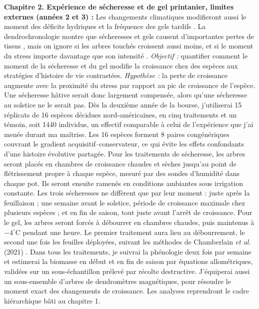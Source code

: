 \documentclass[12pt]{article}
\begin{document}
\textbf{Chapitre 2. Expérience de sécheresse et de gel printanier, limites externes (années 2 et 3) :}
Les changements climatiques modifieront aussi le moment des déficits hydriques et la fréquence des gels tardifs \cite{dox_wood_2022}. La dendrochronologie montre que sécheresses et gels causent d'importantes pertes de tissus \cite{kramer_why_2012,baumgarten_no_2023,dandrea_winters_2019}, mais on ignore si les arbres touchés croissent aussi moins, et si le moment du stress importe davantage que son intensité \cite{chamberlain_late_2021,baumgarten_no_2023,lian_summer_2020,zhang_drought_2021}. \textit{Objectif :} quantifier comment le moment de la sécheresse et du gel modifie la croissance chez des espèces aux stratégies d'histoire de vie contrastées. \textit{Hypothèse :} la perte de croissance augmente avec la proximité du stress par rapport au pic de croissance de l'espèce. Une sécheresse hâtive serait donc largement compensée, alors qu'une sécheresse au solstice ne le serait pas.
Dès la deuxième année de la bourse, j'utiliserai 15 réplicats de 16 espèces décidues nord-américaines, en cinq traitements et un témoin, soit 1440 individus, un effectif comparable à celui de l'expérience que j'ai menée durant ma maîtrise. Les 16 espèces forment 8 paires congénériques couvrant le gradient acquisitif--conservateur, ce qui évite les effets confondants d'une histoire évolutive partagée. Pour les traitements de sécheresse, les arbres seront placés en chambres de croissance chaudes et sèches jusqu'au point de flétrissement propre à chaque espèce, mesuré par des sondes d'humidité dans chaque pot. Ils seront ensuite ramenés en conditions ambiantes sous irrigation constante. Les trois sécheresses ne diffèrent que par leur moment : juste après la feuillaison ; une semaine avant le solstice, période de croissance maximale chez plusieurs espèces \cite{anderson-teixeira_carbon_2021,dorangeville_drought_2018,mcmahon_general_2015} ; et en fin de saison, tout juste avant l'arrêt de croissance. Pour le gel, les arbres seront forcés à débourrer en chambres chaudes, puis maintenus à $-4^{\circ}$C pendant une heure. Le premier traitement aura lieu au débourrement, le second une fois les feuilles déployées, suivant les méthodes de Chamberlain \textit{et al}. (2021) \cite{chamberlain_late_2021}. Dans tous les traitements, je suivrai la phénologie deux fois par semaine et estimerai la biomasse en début et en fin de saison par équations allométriques, validées sur un sous-échantillon prélevé par récolte destructive. J'équiperai aussi un sous-ensemble d'arbres de dendromètres magnétiques, pour résoudre le moment exact des changements de croissance. Les analyses reprendront le cadre hiérarchique bâti au chapitre 1.
\end{document}

